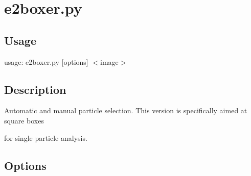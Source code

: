 \section{e2boxer.py}  \label{e2boxer.py}
\subsection{Usage}
usage: e2boxer.py [options] $<$image$>$


\subsection{Description}
Automatic and manual particle selection. This version is specifically aimed at square boxes

for single particle analysis.




\subsection{Options}


